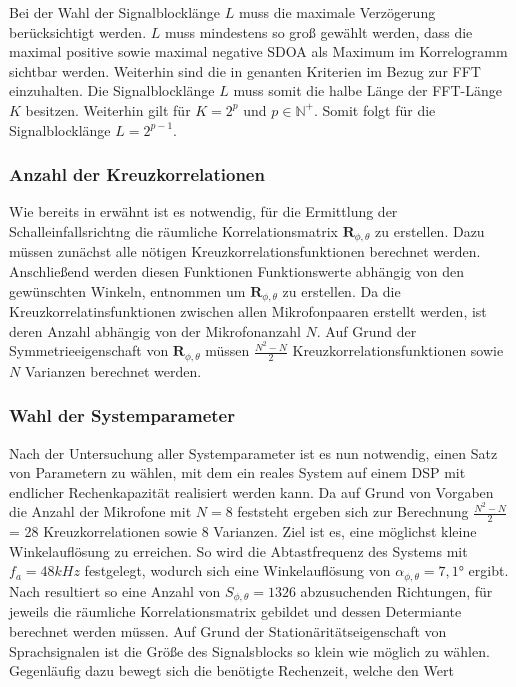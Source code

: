 Bei der Wahl der Signalblocklänge $L$ muss die maximale Verzögerung berücksichtigt werden. $L$ muss mindestens so groß gewählt werden, dass die maximal positive sowie maximal negative SDOA als Maximum im Korrelogramm sichtbar werden. Weiterhin sind die in  genanten Kriterien im Bezug zur FFT einzuhalten. Die Signalblocklänge $L$ muss somit die halbe Länge der FFT-Länge $K$ besitzen. Weiterhin gilt für $K = 2^p$ und $p \in  \mathbb{N}^{+}$. Somit folgt für die Signalblocklänge $L = 2^{p-1}$.

\subsubsection{Anzahl der Kreuzkorrelationen}
Wie bereits in  erwähnt ist es notwendig, für die Ermittlung der Schalleinfallsrichtng die räumliche Korrelationsmatrix $\mathbf{R}_{\phi,\theta}$ zu erstellen. Dazu müssen zunächst alle nötigen Kreuzkorrelationsfunktionen berechnet werden. Anschließend werden diesen Funktionen Funktionswerte abhängig von den gewünschten Winkeln, entnommen um $\mathbf{R}_{\phi,\theta}$ zu erstellen. Da die Kreuzkorrelatinsfunktionen zwischen allen Mikrofonpaaren erstellt werden, ist deren Anzahl abhängig von der Mikrofonanzahl $N$. Auf Grund der Symmetrieeigenschaft von $\mathbf{R}_{\phi,\theta}$ müssen $\frac{N^2-N}{2}$  Kreuzkorrelationsfunktionen sowie $N$ Varianzen berechnet werden.



\subsubsection{Wahl der Systemparameter}
\label{subsubsec:WahlSystemparateter}
Nach der Untersuchung aller Systemparameter ist es nun notwendig, einen Satz von Parametern zu wählen, mit dem ein reales System auf einem DSP mit endlicher Rechenkapazität realisiert werden kann. Da auf Grund von Vorgaben die Anzahl der Mikrofone mit $N=8$ feststeht ergeben sich zur Berechnung $\frac{N^2-N}{2}$ = 28 Kreuzkorrelationen sowie 8 Varianzen. Ziel ist es, eine möglichst kleine Winkelauflösung zu erreichen. So wird die Abtastfrequenz des Systems mit $f_a=48kHz$ festgelegt, wodurch sich eine Winkelauflösung von $\alpha_{\phi, \theta}=7,1°$ ergibt. Nach  resultiert so eine Anzahl von $S_{\phi,\theta} = 1326$ abzusuchenden Richtungen, für jeweils die räumliche Korrelationsmatrix gebildet und dessen Determiante berechnet werden müssen. Auf Grund der Stationäritätseigenschaft von Sprachsignalen ist die Größe des Signalsblocks so klein wie möglich zu wählen. Gegenläufig dazu bewegt sich die benötigte Rechenzeit, welche den Wert 

